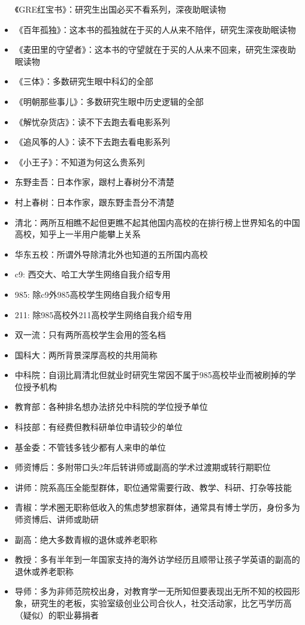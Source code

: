 \documentclass[]{tufte-book}
\begin{document}
\begin{itemize}
  《GRE红宝书》：研究生出国必买不看系列，深夜助眠读物
\item
  《百年孤独》：这本书的孤独就在于买的人从来不陪伴，研究生深夜助眠读物
\item
  《麦田里的守望者》：这本书的守望就在于买的人从来不回来，研究生深夜助眠读物
\item
  《三体》：多数研究生眼中科幻的全部
\item
  《明朝那些事儿》：多数研究生眼中历史逻辑的全部
\item
  《解忧杂货店》：读不下去跑去看电影系列
\item
  《追风筝的人》：读不下去跑去看电影系列
\item
  《小王子》：不知道为何这么贵系列
\item
  东野圭吾：日本作家，跟村上春树分不清楚
\item
  村上春树：日本作家，跟东野圭吾分不清楚
\item
  清北：两所互相瞧不起但更瞧不起其他国内高校的在排行榜上世界知名的中国高校，知乎上一半用户能攀上关系
\item
  华东五校：所谓外导除清北外也知道的五所国内高校
\item
  c9: 西交大、哈工大学生网络自我介绍专用
\item
  985: 除c9外985高校学生网络自我介绍专用
\item
  211: 除985高校外211高校学生网络自我介绍专用
\item
  双一流：只有两所高校学生会用的签名档
\item
  国科大：两所背景深厚高校的共用简称
\item
  中科院：自诩比肩清北但就业时研究生常因不属于985高校毕业而被刷掉的学位授予机构
\item
  教育部：各种排名想办法挤兑中科院的学位授予单位
\item
  科技部：有经费但教科研单位申请较少的单位
\item
  基金委：不管钱多钱少都有人来申的单位
\item
  师资博后：多附带口头2年后转讲师或副高的学术过渡期或转行期职位
\item
  讲师：院系高压全能型群体，职位通常需要行政、教学、科研、打杂等技能
\item
  青椒：学术圈无职称低收入的焦虑梦想家群体，通常具有博士学历，身份多为师资博后、讲师或助研
\item
  副高：绝大多数青椒的退休或养老职称
\item
  教授：多有半年到一年国家支持的海外访学经历且顺带让孩子学英语的副高的退休或养老职称
\item
  导师：多为非师范院校出身，对教育学一无所知但要表现出无所不知的校园形象，研究生的老板，实验室级创业公司合伙人，社交活动家，比乞丐学历高（疑似）的职业募捐者

\end{itemize}
\end{document}

